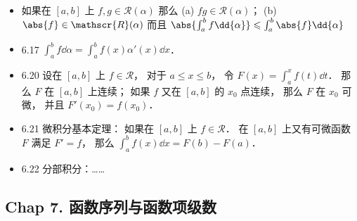 \begin{itemize}
\item 如果在 $[a,b]$ 上 $f,g\in \mathscr{R}(\alpha)$ 那么 (a) $fg\in \mathscr{R}(\alpha)$； (b) $\abs{f}\in \mathscr{R}(\alpha)$ 而且 $\abs{\int_a^bf\dd{\alpha}} \leqslant \int_a^b\abs{f}\dd{\alpha}$

\item 6.17 $\int_a^b f\dd{\alpha} = \int_a^b f(x)\alpha'(x)\dd{x}$．

\item 6.20 设在 $[a,b]$ 上 $f\in \mathscr{R}$， 对于 $a\leqslant x\leqslant b$， 令 $F(x) = \int_a^x f(t)\dd{t}$． 那么 $F$ 在 $[a,b]$ 上连续； 如果 $f$ 又在 $[a,b]$ 的 $x_0$ 点连续， 那么 $F$ 在 $x_0$ 可微， 并且 $F'(x_0) = f(x_0)$．

\item 6.21 微积分基本定理： 如果在 $[a,b]$ 上 $f\in \mathscr{R}$． 在 $[a,b]$ 上又有可微函数 $F$ 满足 $F' = f$， 那么 $\int_a^b f(x)\dd{x} = F(b)-F(a)$．

\item 6.22 分部积分：……
\end{itemize}

\subsection{Chap 7. 函数序列与函数项级数}

